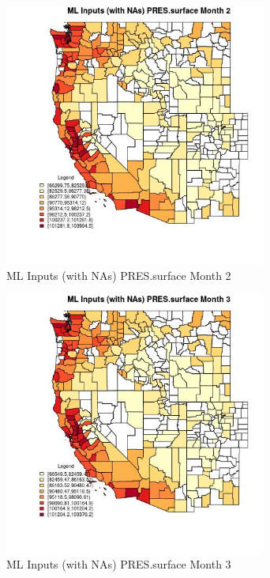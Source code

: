 \begin{figure} 
\centering  
\includegraphics[width=0.77\textwidth]{Code_Outputs/Report_ML_input_PM25_Step4_part_f_de_duplicated_aveswNAs_CountyPRESsurfacemedianMonth2.jpg} 
\caption{\label{fig:Report_ML_input_PM25_Step4_part_f_de_duplicated_aveswNAsCountyPRESsurfacemedianMonth2}ML Inputs (with NAs) PRES.surface Month 2} 
\end{figure} 
 

\begin{figure} 
\centering  
\includegraphics[width=0.77\textwidth]{Code_Outputs/Report_ML_input_PM25_Step4_part_f_de_duplicated_aveswNAs_CountyPRESsurfacemedianMonth3.jpg} 
\caption{\label{fig:Report_ML_input_PM25_Step4_part_f_de_duplicated_aveswNAsCountyPRESsurfacemedianMonth3}ML Inputs (with NAs) PRES.surface Month 3} 
\end{figure} 
 

